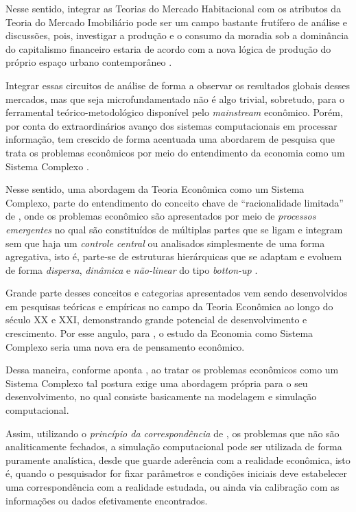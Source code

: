 Nesse sentido, integrar as Teorias do Mercado Habitacional com os atributos da Teoria do Mercado Imobiliário pode ser um campo bastante frutífero de análise e discussões, pois,  investigar a produção e o consumo da moradia sob a dominância do capitalismo financeiro  estaria de acordo com a nova lógica de produção do próprio espaço urbano contemporâneo \cite{HARVEY2005, ROLNIK2015}. 

Integrar essas circuitos de análise de forma a observar os resultados globais desses mercados, mas que seja microfundamentado não é algo trivial, sobretudo, para o ferramental teórico-metodológico disponível pelo \textit{mainstream} econômico. Porém, por conta do extraordinários avanço dos sistemas computacionais em processar informação, tem crescido de forma acentuada uma abordarem de pesquisa que trata os problemas econômicos por meio do entendimento da economia como um Sistema Complexo \cite{Colander2004}.


Nesse sentido, uma abordagem da Teoria Econômica como um Sistema Complexo, parte do entendimento do conceito chave de \enquote{racionalidade limitada} de , onde os problemas econômico são apresentados por meio de \textit{processos emergentes} no qual são constituídos de múltiplas partes que se ligam e integram sem que haja um \textit{controle central} ou analisados simplesmente de uma forma agregativa, isto é, parte-se de estruturas hierárquicas que se adaptam e evoluem de forma \textit{dispersa}, \textit{dinâmica} e \textit{não-linear} do tipo \textit{botton-up} \cite{Foster2005}.

Grande parte desses conceitos e categorias apresentados vem sendo desenvolvidos em pesquisas teóricas e empíricas no campo da Teoria Econômica ao longo do século XX e XXI, demonstrando grande potencial de desenvolvimento e crescimento. Por esse angulo, para , o estudo da Economia como Sistema Complexo seria uma nova era de pensamento econômico.

Dessa maneira, conforme aponta , ao tratar os problemas econômicos como um Sistema Complexo tal postura exige uma abordagem própria para o seu desenvolvimento, no qual consiste basicamente na modelagem e simulação computacional. 

Assim, utilizando o \textit{princípio da correspondência} de , os problemas que não são analiticamente fechados, a simulação computacional pode ser utilizada de forma puramente analística, desde que guarde aderência com a realidade econômica, isto é, quando o pesquisador for fixar parâmetros e condições iniciais deve estabelecer uma correspondência com a realidade estudada, ou ainda via calibração com as informações ou dados efetivamente encontrados.

